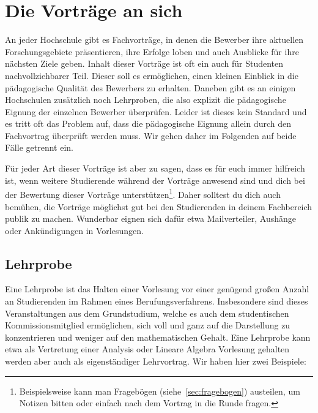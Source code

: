 \section{Die Vorträge an sich}
An jeder Hochschule gibt es Fachvorträge, in denen die Bewerber ihre aktuellen Forschungsgebiete präsentieren, ihre Erfolge loben und auch Ausblicke für ihre nächsten Ziele geben. Inhalt dieser Vorträge ist oft ein auch für Studenten nachvollziehbarer Teil. Dieser soll es ermöglichen, einen kleinen Einblick in die pädagogische Qualität des Bewerbers zu erhalten. Daneben gibt es an einigen Hochschulen zusätzlich noch Lehrproben, die also explizit die pädagogische Eignung der einzelnen Bewerber überprüfen. Leider ist dieses kein Standard und es tritt oft das Problem auf, dass die pädagogische Eignung allein durch den Fachvortrag überprüft werden muss. Wir gehen daher im Folgenden auf beide Fälle getrennt ein.

Für jeder Art dieser Vorträge ist aber zu sagen, dass es für euch immer hilfreich ist, wenn weitere Studierende während der Vorträge anwesend sind und dich bei der Bewertung dieser Vorträge unterstützen\footnote{Beispielsweise kann man Fragebögen (siehe~\ref{sec:fragebogen}) austeilen, um Notizen bitten oder einfach nach dem Vortrag in die Runde fragen.}. Daher solltest du dich auch bemühen, die Vorträge möglichst gut bei den Studierenden in deinem Fachbereich publik zu machen. Wunderbar eignen sich dafür etwa Mailverteiler, Aushänge oder Ankündigungen in Vorlesungen.

\subsection{Lehrprobe}
Eine Lehrprobe ist das Halten einer Vorlesung vor einer genügend großen Anzahl an Studierenden im Rahmen eines Berufungsverfahrens. Insbesondere sind dieses Veranstaltungen aus dem Grundstudium, welche es auch dem studentischen Kommissionsmitglied ermöglichen, sich voll und ganz auf die Darstellung zu konzentrieren und weniger auf den mathematischen Gehalt. Eine Lehrprobe kann etwa als Vertretung einer Analysis oder Lineare Algebra Vorlesung gehalten werden aber auch als eigenständiger Lehrvortrag. Wir haben hier zwei Beispiele:

